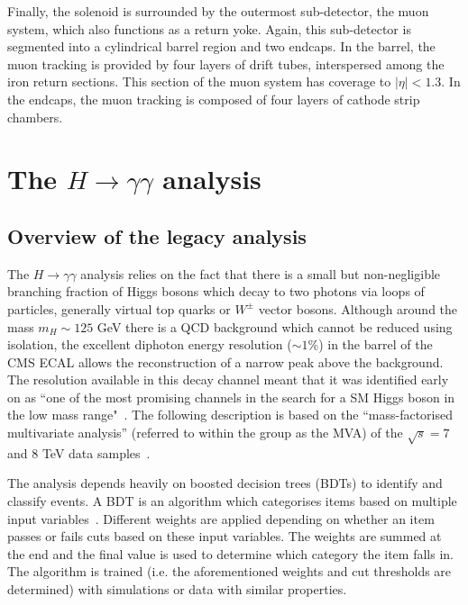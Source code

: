 \documentclass[10pt]{article}
\begin{document}
Finally, the solenoid is surrounded by the outermost sub-detector, the muon system, which also functions as a return yoke. Again, this sub-detector is segmented into a cylindrical barrel region and two endcaps. In the barrel, the muon tracking is provided by four layers of drift tubes, interspersed among the iron return sections. This section of the muon system has coverage to $|\eta| <1.3$. In the endcaps, the muon tracking is composed of four layers of cathode strip chambers.~\cite{cmsMuon}


\section{The $H \rightarrow \gamma \gamma$ analysis}

\subsection{Overview of the legacy analysis}

The $H \rightarrow \gamma \gamma$ analysis relies on the fact that there is a small but non-negligible branching fraction of Higgs bosons which decay to two photons via loops of particles, generally virtual top quarks or $W^{\pm}$ vector bosons. Although around the mass $m_H \sim 125$ GeV there is a QCD background which cannot be reduced using isolation, the excellent diphoton energy resolution ($\sim 1 \%$) in the barrel of the CMS ECAL allows the reconstruction of a narrow peak above the background. The resolution available in this decay channel meant that it was identified early on as “one of the most promising channels in the search for a SM Higgs boson in the low mass range"~\cite{Seez}. The following description is based on the ``mass-factorised multivariate analysis'' (referred to within the group as  the MVA) of the $\sqrt{s}=7$ and $8$ TeV data samples~\cite{HDisc}. 

The analysis depends heavily on boosted decision trees (BDTs) to identify and classify events. A BDT is an algorithm which categorises items based on multiple input variables~\cite{BDT}. Different weights are applied depending on whether an item passes or fails cuts based on these input variables. The weights are summed at the end and the final value is used to determine which category the item falls in. The algorithm is trained (i.e. the aforementioned weights and cut thresholds are determined) with simulations or data with similar properties. %
\end{document}
